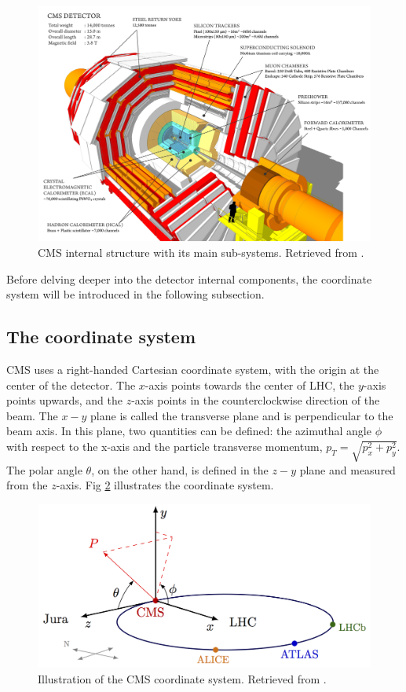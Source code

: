 \begin{figure}[htp!]
	\centering
	\includegraphics[scale=0.2]{MainContent/Figs/cms_structure.png}
	\caption{CMS internal structure with its main sub-systems. Retrieved from \cite{sanchez2020search}.}
	\label{fig:CMS_structure}
\end{figure}


Before delving deeper into the detector internal components, the coordinate system will be introduced in the following subsection.

\subsection{The coordinate system}
CMS uses a right-handed Cartesian coordinate system, with the origin at the center of the detector. The $x$-axis points towards the center of LHC, the $y$-axis points upwards, and the $z$-axis points in the counterclockwise direction of the beam. The $x-y$ plane is called the transverse plane and is perpendicular to the beam axis. In this plane, two quantities can be defined: the azimuthal angle $\phi$ with respect to the x-axis and the particle transverse momentum, $p_T = \sqrt{p_x^2 + p_y^2}$. The polar angle $\theta$, on the other hand, is defined in the $z-y$ plane and measured from the $z$-axis. Fig \ref{fig:cms_coordinate_system} illustrates the coordinate system.


\begin{figure}[htp!]
	\centering
	\includegraphics{MainContent/Figs/cms_coordinate_system.png}
	\caption{Illustration of the CMS coordinate system. Retrieved from \cite{bonanomi2021response}.}
	\label{fig:cms_coordinate_system}
\end{figure}


